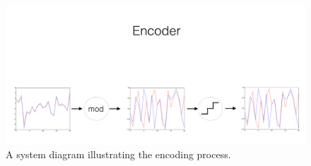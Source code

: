 \documentclass{amsart}
\begin{document}






\begin{figure} 
\begin{center} 
\includegraphics[scale=0.4]{encoderdiagram.png} 
\caption{A system diagram illustrating the encoding process. %
}
\end{center}
\end{figure}
\end{document}
